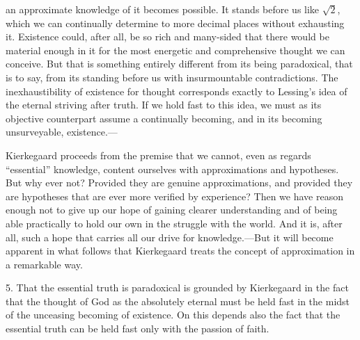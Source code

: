 \documentclass[12pt,a4paper]{book}
\newcommand{\opage}[1]{\marginnote{\footnotesize\textit{[#1]}}}
\begin{document}
an approximate knowledge of it becomes possible. It stands before us like
$\sqrt{2}$, which we can continually determine to more decimal places
without exhausting it. Existence could, after all, be so rich and
many-sided that there would be material enough in it for the most
energetic and comprehensive thought we can conceive. But that is
something entirely different from its being paradoxical, that is to say,
from its standing before us with insurmountable contradictions. The
inexhaustibility of existence for thought corresponds exactly to
Lessing's idea of the eternal striving after truth. If we hold fast to
this idea, we must as its objective counterpart assume a continually
becoming, and in its becoming unsurveyable, existence.---

Kierkegaard proceeds from the premise that we cannot, even as regards
``essential'' knowledge, content ourselves with
\opage{66}approximations and hypotheses. But why ever not? Provided they are
genuine approximations, and provided they are hypotheses that are ever
more verified by experience? Then we have reason enough not to give up
our hope of gaining clearer understanding and of being able practically
to hold our own in the struggle with the world. And it is, after all,
such a hope that carries all our drive for knowledge.---But it will
become apparent in what follows that Kierkegaard treats the concept of
approximation in a remarkable way.

5. That the essential truth is paradoxical is grounded by Kierkegaard in
the fact that the thought of God as the absolutely eternal must be held
fast in the midst of the unceasing becoming of existence. On this depends
also the fact that the essential truth can be held fast only with the
passion of faith.
\end{document}
